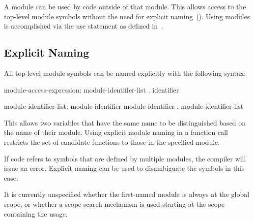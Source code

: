A module can be used by code outside of that module.  This allows
access to the top-level module symbols without the need for explicit
naming~().  Using modules is accomplished via
the use statement as defined in~.

\subsection{Explicit Naming}
\label{Explicit_Naming}

All top-level module symbols can be named explicitly with the
following syntax:
\begin{syntax}
module-access-expression:
  module-identifier-list . identifier

module-identifier-list:
  module-identifier
  module-identifier . module-identifier-list

\end{syntax}
This allows two variables that have the same name to be distinguished
based on the name of their module.  Using explicit module naming in a
function call restricts the set of candidate functions to those in the
specified module.

If code refers to symbols that are defined by multiple modules, the
compiler will issue an error.  Explicit naming can be used to
disambiguate the symbols in this case.

\begin{openissue}
It is currently unspecified whether the
first-named module is always at the global scope, or whether a
scope-search mechanism is used starting at the scope containing the
usage.
\end{openissue}


